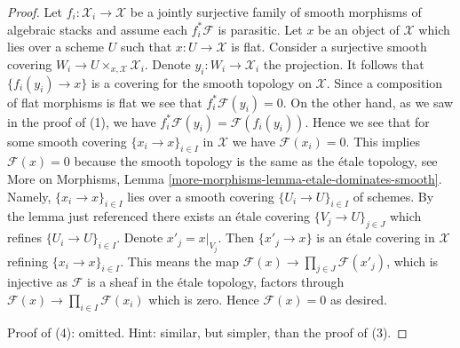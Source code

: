 \documentclass[10pt,a4paper]{amsart}
\theoremstyle{plain}
\theoremstyle{definition}
\theoremstyle{remark}
\numberwithin{equation}{subsection}
\begin{document}
\begin{proof}
\medskip\noindent
Let $f_i : \mathcal{X}_i \to \mathcal{X}$ be a jointly surjective family of
smooth morphisms of algebraic stacks and assume each $f_i^*\mathcal{F}$
is parasitic. Let $x$ be an object of $\mathcal{X}$ which lies over a
scheme $U$ such that $x : U \to \mathcal{X}$ is flat. Consider a surjective
smooth covering $W_i \to U \times_{x, \mathcal{X}} \mathcal{X}_i$.
Denote $y_i : W_i \to \mathcal{X}_i$ the projection. It follows
that $\{f_i(y_i) \to x\}$ is a covering for the smooth topology
on $\mathcal{X}$. Since a composition of flat morphisms is flat we see that
$f_i^*\mathcal{F}(y_i) = 0$. On the other hand, as we saw in the proof
of (1), we have $f_i^*\mathcal{F}(y_i) = \mathcal{F}(f_i(y_i))$.
Hence we see that for some smooth covering $\{x_i \to x\}_{i \in I}$
in $\mathcal{X}$ we have $\mathcal{F}(x_i) = 0$. This implies
$\mathcal{F}(x) = 0$ because the smooth topology is the same
as the \'etale topology, see
More on Morphisms, Lemma \ref{more-morphisms-lemma-etale-dominates-smooth}.
Namely, $\{x_i \to x\}_{i \in I}$ lies over a smooth covering
$\{U_i \to U\}_{i \in I}$ of schemes. By the lemma just referenced
there exists an \'etale covering $\{V_j \to U\}_{j \in J}$ which
refines $\{U_i \to U\}_{i \in I}$. Denote $x'_j = x|_{V_j}$.
Then $\{x'_j \to x\}$ is an \'etale covering in $\mathcal{X}$
refining $\{x_i \to x\}_{i \in I}$. This means the map
$\mathcal{F}(x) \to \prod_{j \in J} \mathcal{F}(x'_j)$, which is
injective as $\mathcal{F}$ is a sheaf in the \'etale topology,
factors through $\mathcal{F}(x) \to \prod_{i \in I} \mathcal{F}(x_i)$
which is zero. Hence $\mathcal{F}(x) = 0$ as desired.

\medskip\noindent
Proof of (4): omitted. Hint: similar, but simpler, than the proof of (3).
\end{proof}
\end{document}
